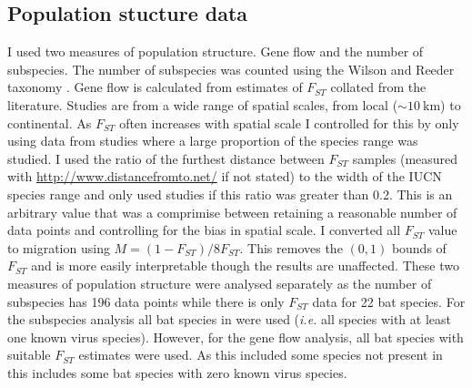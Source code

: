 \subsection{Population stucture data}

I used two measures of population structure. 
Gene flow and the number of subspecies.
The number of subspecies was counted using the Wilson and Reeder taxonomy \cite{wilson2005mammal}.
Gene flow is calculated from estimates of $F_{ST}$ collated from the literature.
Studies are from a wide range of spatial scales, from local ($\sim\SI{10}{\kilo\metre}$) to continental.
As $F_{ST}$ often increases with spatial scale \cite{burland1999population, hulva2010mechanisms, o2015genetic, vonhof2015range} I controlled for this by only using data from studies where a large proportion of the species range was studied.
I used the ratio of the furthest distance between $F_{ST}$ samples (measured with \url{http://www.distancefromto.net/} if not stated) to the width of the IUCN species range \cite{iucn} and only used studies if this ratio was greater than 0.2.
This is an arbitrary value that was a comprimise between retaining a reasonable number of data points and controlling for the bias in spatial scale.
I converted all $F_{ST}$ value to migration using $M = (1-F_{ST})/8F_{ST}$.
This removes the $(0, 1)$ bounds of $F_{ST}$ and is more easily interpretable though the results are unaffected. 
These two measures of population structure were analysed separately as the number of subspecies has 196 data points while there is only $F_{ST}$ data for 22 bat species.
For the subspecies analysis all bat species in \textcite{luis2013comparison} were used (\emph{i.e.} all species with at least one known virus species).
However, for the gene flow analysis, all bat species with suitable $F_{ST}$ estimates were used.
As this included some species not present in \textcite{luis2013comparison} this includes some bat species with zero known virus species. 




























